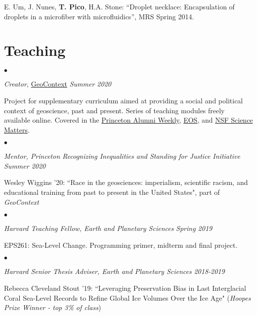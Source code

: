 \documentclass[margin,line]{res}
\newenvironment{list2}{
  \begin{list}{$\bullet$}{%
      \setlength{\itemsep}{0in}
      \setlength{\parsep}{0in} \setlength{\parskip}{0in}
      \setlength{\topsep}{0in} \setlength{\partopsep}{0in} 
      \setlength{\leftmargin}{0.00in}}}{\end{list}}
\begin{document}
\begin{resume}
E. Um, J. Nunes, {\bf T. Pico}, H.A. Stone: ``Droplet necklace: Encapsulation of droplets in a microfiber with microfluidics”, MRS Spring 2014. 


\section{\sc Teaching}

\begin{list2}
\item[] {\em Creator,} \href{https://geo-context.github.io/}{GeoContext} \hfill {\em Summer 2020}
\item[] Project for supplementary curriculum aimed at providing a social and political context of geoscience, past and present. Series of teaching modules freely available online.
Covered in the  \href{https://paw.princeton.edu/article/geoscientists-explore-scientific-racism-teachings-princeton-pioneer}{Princeton Alumni Weekly},  \href{https://eos.org/articles/teaching-geoscience-history-in-context}{EOS}, and \href{https://beta.nsf.gov/science-matters/promoting-diversity-and-inclusivity-geoscience-confronting-its-past}{NSF Science Matters}.
\end{list2}
\vspace{0.2 cm}

\begin{list2}
\item[] {\em Mentor, Princeton Recognizing Inequalities and Standing for Justice Initiative} \hfill {\em Summer 2020}
\item[] Wesley Wiggins '20: ``Race in the geosciences: imperialism, scientific racism, and educational training from past to present in the United States", part of {\em GeoContext}
\end{list2}
\vspace{0.2 cm}

\begin{list2}
\item[] {\em Harvard Teaching Fellow, Earth and Planetary Sciences} \hfill {\em Spring 2019}
\item[] EPS261: Sea-Level Change. Programming primer, midterm and final project.
\end{list2}
\vspace{0.2 cm}

\begin{list2}
\item[] {\em Harvard Senior Thesis Adviser, Earth and Planetary Sciences} \hfill {\em  2018-2019}
\item[] Rebecca Cleveland Stout '19: ``Leveraging Preservation Bias in Last Interglacial Coral Sea-Level Records to Refine Global Ice Volumes Over the Ice Age" ({\em Hoopes Prize Winner - top 3\% of class})
\end{list2}
\vspace{0.2 cm}


\end{resume}
\end{document}
